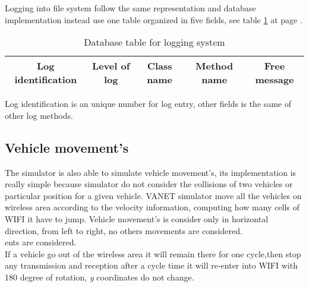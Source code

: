Logging into file system follow the same representation and database implementation instead use one table organized in five fields, see table \ref{tab:DBLog} at page \pageref{tab:DBLog}.
\begin{table}[!ht]
	\centering
	\caption{Database table for logging system}
	\begin{tabular}{|c|c|c|c|c|}
	\hline\hline 
	\textbf{Log identification} & \textbf{Level of log} & \textbf{Class name} & \textbf{Method name} & \textbf{Free message}\\
	\hline
	\hline     %
 	\end{tabular} 
	\label{tab:DBLog}
\end{table}
Log identification is an unique number for log entry, other fields is the same of other log methods.
\subsection{Vehicle movement's}
The simulator is also able to simulate vehicle movement's, its implementation is really simple because simulator do not consider the collisions of two vehicles or particular position for a given vehicle. VANET simulator move all the vehicles on wireless area according to the velocity information, computing how many cells of WIFI it have to jump. Vehicle movement's is consider only in horizontal direction, from left to right, no others movements are considered.\\ents are considered.\\
If a vehicle go out of the wireless area it will remain there for one cycle,then stop any transmission and reception after a cycle time it will re-enter into WIFI with 180 degree of rotation, \textit{y} coordinates do not change.